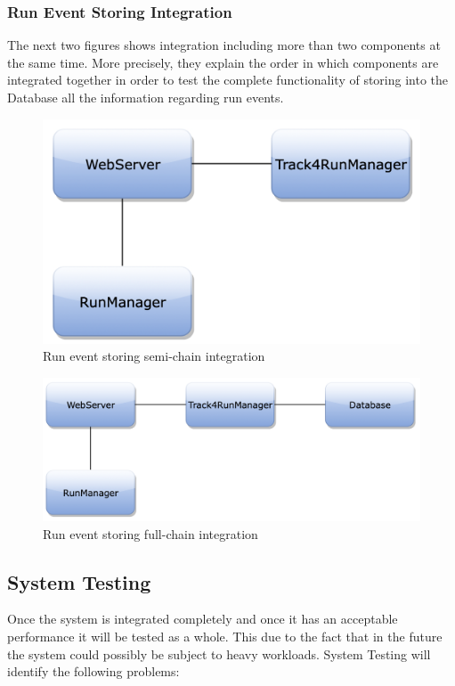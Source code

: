 \subsubsection{Run Event Storing Integration}
The next two figures shows integration including more than two components at the same time. More precisely, they explain the order in which components are integrated together in order to test the complete functionality of storing into the Database all the information regarding run events. 
\begin{figure}[H]
\centering
\includegraphics[scale=0.35]{Images/IntegrationPlanImages/fig17.png}
\caption{Run event storing semi-chain integration}
\end{figure}

\begin{figure}[H]
\centering
\includegraphics[scale=0.35]{Images/IntegrationPlanImages/fig18.png}
\caption{Run event storing full-chain integration}
\end{figure}


\subsection{System Testing}
Once the system is integrated completely and once it has an acceptable performance it will be tested as a whole. This due to the fact that in the future the system could possibly be subject to heavy workloads. System Testing will identify the following problems:

